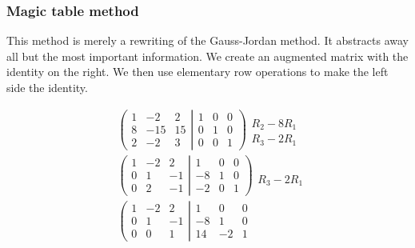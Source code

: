 \documentclass[usenames,dvipsnames,aspectratio=169,10pt]{beamer}
\numberwithin{equation}{section}
\begin{document}
\begin{frame}
\frametitle{Magic table method}
This method is merely a rewriting of the Gauss-Jordan method. It abstracts away all but the most important information. We create an augmented matrix with the identity on the right. We then use elementary row operations to make the left side the identity.

\begin{minipage}{0.48\textwidth}
\begin{align*}
&
\left(
	\begin{matrix}
		1 &  -2 &  2 \\
		8 & -15 & 15 \\
		2 &  -2 &  3
	\end{matrix}
  \left|
	\begin{matrix}
		1 &  0 &  0 \\
		0 &  1 &  0 \\
		0 &  0 &  1
	\end{matrix}
  \right.
\right)
\begin{array}{l}
   \\
 R_2 - 8R_1 \\
 R_3 - 2R_1
\end{array}
\\
&
\left(
	\begin{matrix}
		1 &  -2 &  2 \\
		0 &   1 & -1 \\
		0 &   2 & -1
	\end{matrix}
  \left|
	\begin{matrix}
		 1 &  0 &  0 \\
		-8 &  1 &  0 \\
		-2 &  0 &  1
	\end{matrix}
  \right.
\right)
\begin{array}{l}
   \\
   \\
 R_3 - 2R_1
\end{array}
\\
&
\left(
	\begin{matrix}
		1 &  -2 &  2 \\
		0 &   1 & -1 \\
		0 &   0 &  1
	\end{matrix}
  \left|
	\begin{matrix}
		 1 &  0 &  0 \\
		-8 &  1 &  0 \\
		14 & -2 &  1

\end{matrix}
\end{align*}
\end{minipage}
\end{frame}
\end{document}
